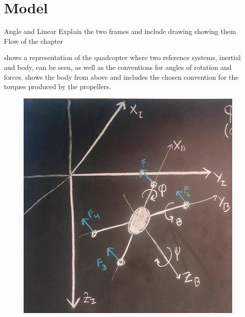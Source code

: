 \chapter{Model}
Angle and Linear
Explain the two frames and include drawing showing them
Flow of the chapter

 shows a representation of the quadcopter where two reference systems, inertial and body, can be seen, as well as the conventions for angles of rotation and forces.  shows the body from above and includes the chosen convention for the torques produced by the propellers.

\begin{minipage}{\linewidth}
	\begin{minipage}{0.45\linewidth}
		\begin{figure}[H]
			\includegraphics[scale=.27]{figures/drone_diagram}
			\centering
			\captionsetup{justification=centering}
			\label{diagramQuad}
		\end{figure}
	\end{minipage}
	\hspace{0.03\linewidth}

\end{minipage}
